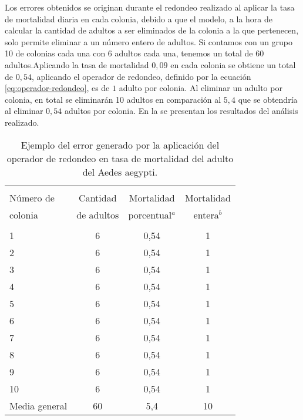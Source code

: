 Los errores obtenidos se originan durante el redondeo realizado al aplicar la tasa de mortalidad
diaria en cada colonia, debido a que el modelo, a la hora de calcular la cantidad de adultos a ser
eliminados de la colonia a la que pertenecen, solo permite eliminar a un número entero de adultos.
Si contamos con un grupo 10 de colonias cada una con 6 adultos cada una, tenemos un total de 60
adultos.Aplicando la tasa de mortalidad $0,09$ en cada colonia se obtiene un total de $0,54$,
aplicando el operador de redondeo, definido por la ecuación \eqref{eq:operador-redondeo}, es de $1$
adulto por colonia. Al eliminar un adulto por colonia, en total se eliminarán 10 adultos en
comparación al $5,4$ que se obtendría al eliminar $0,54$ adultos por colonia. En la
 se presentan los resultados del análisis realizado.

\begin{table}[!htbp]
    \begin{minipage}{\textwidth}
        \centering
        \caption{ \label{tab:mortalidad-adulto-error}Ejemplo del error generado por la aplicación
        del operador de redondeo en tasa de mortalidad del adulto del Aedes aegypti.}
        \begin{tabular}{l c c c }
            \hline \\
            Número de & Cantidad  & Mortalidad      & Mortalidad \\
            colonia   &de adultos & porcentual$^{a}$ & entera$^{b}$\\
            \hline
            \hline \\
            1       & 6  & 0,54 & 1\\
            2       & 6  & 0,54 & 1\\
            3       & 6  & 0,54 & 1\\
            4       & 6  & 0,54 & 1\\
            5       & 6  & 0,54 & 1\\
            6       & 6  & 0,54 & 1\\
            7       & 6  & 0,54 & 1\\
            8       & 6  & 0,54 & 1\\
            9       & 6  & 0,54 & 1\\
            10      & 6  & 0,54 & 1\\
            Media general   & 60 & 5,4  & 10\\
        \end{tabular}
    \end{minipage}
\end{table}

